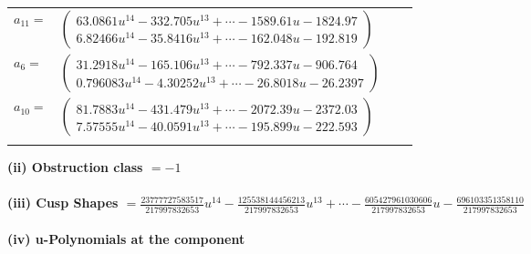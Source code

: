 \documentclass[1p]{elsarticle_modified}
\theoremstyle{definition}
\begin{document}
\begin{tabular}{m{7pt} m{180pt} m{7pt} m{180pt} }
\flushright $a_{11}=$&$\begin{pmatrix}63.0861 u^{14}-332.705 u^{13}+\cdots-1589.61 u-1824.97\\6.82466 u^{14}-35.8416 u^{13}+\cdots-162.048 u-192.819\end{pmatrix}$ \\
\flushright $a_{6}=$&$\begin{pmatrix}31.2918 u^{14}-165.106 u^{13}+\cdots-792.337 u-906.764\\0.796083 u^{14}-4.30252 u^{13}+\cdots-26.8018 u-26.2397\end{pmatrix}$ \\
\flushright $a_{10}=$&$\begin{pmatrix}81.7883 u^{14}-431.479 u^{13}+\cdots-2072.39 u-2372.03\\7.57555 u^{14}-40.0591 u^{13}+\cdots-195.899 u-222.593\end{pmatrix}$\\&\end{tabular}
\flushleft \textbf{(ii) Obstruction class $= -1$}\\~\\
\flushleft \textbf{(iii) Cusp Shapes $= \frac{23777727583517}{217997832653} u^{14}-\frac{125538144456213}{217997832653} u^{13}+\cdots-\frac{605427961030606}{217997832653} u-\frac{696103351358110}{217997832653}$}\\~\\
\newpage\renewcommand{\arraystretch}{1}
\flushleft \textbf{(iv) u-Polynomials at the component}\newline \\
\end{document}
